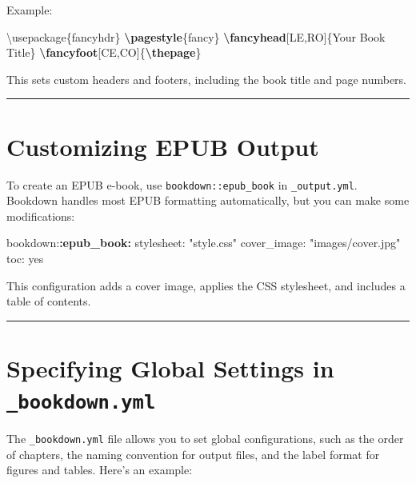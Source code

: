 \documentclass[
]{book}
\newenvironment{Shaded}{\begin{snugshade}}{\end{snugshade}}
\newcommand{\BuiltInTok}[1]{#1}
\newcommand{\ExtensionTok}[1]{#1}
\newcommand{\FunctionTok}[1]{\textcolor[rgb]{0.13,0.29,0.53}{\textbf{#1}}}
\newcommand{\NormalTok}[1]{#1}
\newcommand{\SpecialCharTok}[1]{\textcolor[rgb]{0.81,0.36,0.00}{\textbf{#1}}}
\theoremstyle{definition}
\theoremstyle{definition}
\theoremstyle{definition}
\theoremstyle{definition}
\theoremstyle{remark}
\begin{document}
Example:

\begin{Shaded}
\begin{Highlighting}[]
\BuiltInTok{\textbackslash{}usepackage}\NormalTok{\{}\ExtensionTok{fancyhdr}\NormalTok{\}}
\FunctionTok{\textbackslash{}pagestyle}\NormalTok{\{fancy\}}
\FunctionTok{\textbackslash{}fancyhead}\NormalTok{[LE,RO]\{Your Book Title\}}
\FunctionTok{\textbackslash{}fancyfoot}\NormalTok{[CE,CO]\{}\FunctionTok{\textbackslash{}thepage}\NormalTok{\}}
\end{Highlighting}
\end{Shaded}

This sets custom headers and footers, including the book title and page numbers.

\begin{center}\rule{0.5\linewidth}{0.5pt}\end{center}

\section{Customizing EPUB Output}\label{customizing-epub-output}

To create an EPUB e-book, use \texttt{bookdown::epub\_book} in \texttt{\_output.yml}. Bookdown handles most EPUB formatting automatically, but you can make some modifications:

\begin{Shaded}
\begin{Highlighting}[]
\NormalTok{bookdown:}\SpecialCharTok{:epub\_book:}
\NormalTok{  stylesheet: "style.css"}
\NormalTok{  cover\_image: "images/cover.jpg"}
\NormalTok{  toc: yes}
\end{Highlighting}
\end{Shaded}

This configuration adds a cover image, applies the CSS stylesheet, and includes a table of contents.

\begin{center}\rule{0.5\linewidth}{0.5pt}\end{center}

\section{\texorpdfstring{Specifying Global Settings in \texttt{\_bookdown.yml}}{Specifying Global Settings in \_bookdown.yml}}\label{specifying-global-settings-in-_bookdown.yml}

The \texttt{\_bookdown.yml} file allows you to set global configurations, such as the order of chapters, the naming convention for output files, and the label format for figures and tables. Here's an example:
\end{document}
